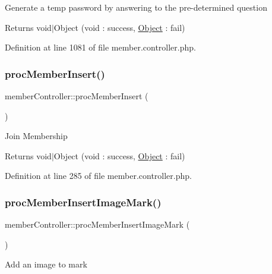 Generate a temp password by answering to the pre-\/determined question

\begin{DoxyReturn}{Returns}
void$\vert$\+Object (void \+: success, \hyperlink{classObject}{Object} \+: fail) 
\end{DoxyReturn}


Definition at line 1081 of file member.\+controller.\+php.

\mbox{\label{classmemberController_a8f176054f72833b01e2229108da0b599}} 
\subsubsection{\texorpdfstring{proc\+Member\+Insert()}{procMemberInsert()}}
{\footnotesize\ttfamily member\+Controller\+::proc\+Member\+Insert (\begin{DoxyParamCaption}{ }\end{DoxyParamCaption})}

Join Membership

\begin{DoxyReturn}{Returns}
void$\vert$\+Object (void \+: success, \hyperlink{classObject}{Object} \+: fail) 
\end{DoxyReturn}


Definition at line 285 of file member.\+controller.\+php.

\mbox{\label{classmemberController_afcb874e178e1c13158e364b891998640}} 
\subsubsection{\texorpdfstring{proc\+Member\+Insert\+Image\+Mark()}{procMemberInsertImageMark()}}
{\footnotesize\ttfamily member\+Controller\+::proc\+Member\+Insert\+Image\+Mark (\begin{DoxyParamCaption}{ }\end{DoxyParamCaption})}

Add an image to mark

